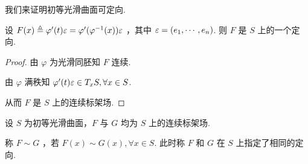 我们来证明初等光滑曲面可定向.

\begin{property}
设 $F(x)\triangleq\varphi'(t)\varepsilon=\varphi'(\varphi^{-1}(x))\varepsilon$ ，其中 $\varepsilon=(e_1,\cdots,e_n)$. 则 $F$ 是 $S$ 上的一个定向.
\end{property}
\begin{proof}
由 $\varphi$ 为光滑同胚知 $F$ 连续.

由 $\varphi$ 满秩知 $\varphi'(t)\varepsilon\in T_xS,\forall x\in S$.

从而 $F$ 是 $S$ 上的连续标架场.
\end{proof}

\begin{definition}
设 $S$ 为初等光滑曲面，$F$ 与 $G$ 均为 $S$ 上的连续标架场.

称 $F\sim G$ ，若 $F(x)\sim G(x),\forall x\in S$. 此时称 $F$ 和 $G$ 在 $S$ 上指定了相同的定向.
\end{definition}

